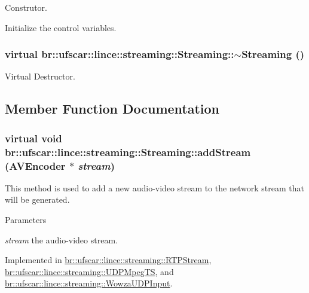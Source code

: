 Construtor. 

Initialize the control variables. \hypertarget{classbr_1_1ufscar_1_1lince_1_1streaming_1_1Streaming_a5723d35392013df85a778df59683aab4}{
\subsubsection[{$\sim$Streaming}]{\setlength{\rightskip}{0pt plus 5cm}virtual br::ufscar::lince::streaming::Streaming::$\sim$Streaming ()}}
\label{classbr_1_1ufscar_1_1lince_1_1streaming_1_1Streaming_a5723d35392013df85a778df59683aab4}


Virtual Destructor. 



\subsection{Member Function Documentation}
\hypertarget{classbr_1_1ufscar_1_1lince_1_1streaming_1_1Streaming_ab2739b46d9bd285d4d64100b9d5bb796}{
\subsubsection[{addStream}]{\setlength{\rightskip}{0pt plus 5cm}virtual void br::ufscar::lince::streaming::Streaming::addStream ({\bf AVEncoder} $\ast$ {\em stream})}}
\label{classbr_1_1ufscar_1_1lince_1_1streaming_1_1Streaming_ab2739b46d9bd285d4d64100b9d5bb796}


This method is used to add a new audio-\/video stream to the network stream that will be generated. 


\begin{DoxyParams}{Parameters}
\item[{\em stream}]the audio-\/video stream. \end{DoxyParams}


Implemented in \hyperlink{classbr_1_1ufscar_1_1lince_1_1streaming_1_1RTPStream_a5533a25709c548aada927315b845b4f3}{br::ufscar::lince::streaming::RTPStream}, \hyperlink{classbr_1_1ufscar_1_1lince_1_1streaming_1_1UDPMpegTS_a8dc5c2ece80e7cf6c94e10582b78de40}{br::ufscar::lince::streaming::UDPMpegTS}, and \hyperlink{classbr_1_1ufscar_1_1lince_1_1streaming_1_1WowzaUDPInput_a0b9876d39a409092f24b5b291a410b90}{br::ufscar::lince::streaming::WowzaUDPInput}.

